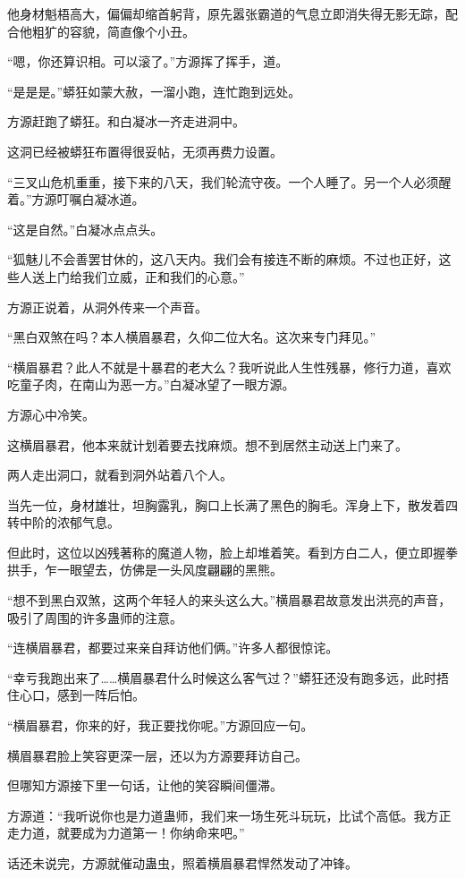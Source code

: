 \begin{this_body}
他身材魁梧高大，偏偏却缩首躬背，原先嚣张霸道的气息立即消失得无影无踪，配合他粗犷的容貌，简直像个小丑。

“嗯，你还算识相。可以滚了。”方源挥了挥手，道。

“是是是。”蟒狂如蒙大赦，一溜小跑，连忙跑到远处。

方源赶跑了蟒狂。和白凝冰一齐走进洞中。

这洞已经被蟒狂布置得很妥帖，无须再费力设置。

“三叉山危机重重，接下来的八天，我们轮流守夜。一个人睡了。另一个人必须醒着。”方源叮嘱白凝冰道。

“这是自然。”白凝冰点点头。

“狐魅儿不会善罢甘休的，这八天内。我们会有接连不断的麻烦。不过也正好，这些人送上门给我们立威，正和我们的心意。”

方源正说着，从洞外传来一个声音。

“黑白双煞在吗？本人横眉暴君，久仰二位大名。这次来专门拜见。”

“横眉暴君？此人不就是十暴君的老大么？我听说此人生性残暴，修行力道，喜欢吃童子肉，在南山为恶一方。”白凝冰望了一眼方源。

方源心中冷笑。

这横眉暴君，他本来就计划着要去找麻烦。想不到居然主动送上门来了。

两人走出洞口，就看到洞外站着八个人。

当先一位，身材雄壮，坦胸露乳，胸口上长满了黑色的胸毛。浑身上下，散发着四转中阶的浓郁气息。

但此时，这位以凶残著称的魔道人物，脸上却堆着笑。看到方白二人，便立即握拳拱手，乍一眼望去，仿佛是一头风度翩翩的黑熊。

“想不到黑白双煞，这两个年轻人的来头这么大。”横眉暴君故意发出洪亮的声音，吸引了周围的许多蛊师的注意。

“连横眉暴君，都要过来亲自拜访他们俩。”许多人都很惊诧。

“幸亏我跑出来了……横眉暴君什么时候这么客气过？”蟒狂还没有跑多远，此时捂住心口，感到一阵后怕。

“横眉暴君，你来的好，我正要找你呢。”方源回应一句。

横眉暴君脸上笑容更深一层，还以为方源要拜访自己。

但哪知方源接下里一句话，让他的笑容瞬间僵滞。

方源道：“我听说你也是力道蛊师，我们来一场生死斗玩玩，比试个高低。我方正走力道，就要成为力道第一！你纳命来吧。”

话还未说完，方源就催动蛊虫，照着横眉暴君悍然发动了冲锋。


\end{this_body}
